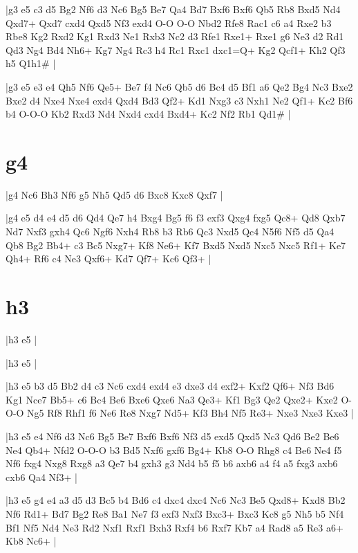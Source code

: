 \whitename{}
\blackname{}
\makegametitle
|g3 e5 c3 d5 Bg2 Nf6 d3 Nc6 Bg5 Be7 Qa4 Bd7 Bxf6 Bxf6 Qb5 Rb8 Bxd5 Nd4 Qxd7+ Qxd7 cxd4 Qxd5 Nf3 exd4 O-O O-O Nbd2 Rfe8 Rac1 c6 a4 Rxe2 b3 Rbe8 Kg2 Rxd2 Kg1 Rxd3 Ne1 Rxb3 Nc2 d3 Rfe1 Rxe1+ Rxe1 g6 Ne3 d2 Rd1 Qd3 Ng4 Bd4 Nh6+ Kg7 Ng4 Rc3 h4 Rc1 Rxc1 dxc1=Q+ Kg2 Qcf1+ Kh2 Qf3 h5 Q1h1\#  |

\whitename{}
\blackname{}
\makegametitle
|g3 e5 e3 e4 Qh5 Nf6 Qe5+ Be7 f4 Nc6 Qb5 d6 Bc4 d5 Bf1 a6 Qe2 Bg4 Nc3 Bxe2 Bxe2 d4 Nxe4 Nxe4 exd4 Qxd4 Bd3 Qf2+ Kd1 Nxg3 c3 Nxh1 Ne2 Qf1+ Kc2 Bf6 b4 O-O-O Kb2 Rxd3 Nd4 Nxd4 cxd4 Bxd4+ Kc2 Nf2 Rb1 Qd1\#  |

\section{g4}

\whitename{}
\blackname{}
\makegametitle
|g4 Nc6 Bh3 Nf6 g5 Nh5 Qd5 d6 Bxc8 Kxc8 Qxf7  |

\whitename{}
\blackname{}
\makegametitle
|g4 e5 d4 e4 d5 d6 Qd4 Qe7 h4 Bxg4 Bg5 f6 f3 exf3 Qxg4 fxg5 Qc8+ Qd8 Qxb7 Nd7 Nxf3 gxh4 Qc6 Ngf6 Nxh4 Rb8 b3 Rb6 Qc3 Nxd5 Qc4 N5f6 Nf5 d5 Qa4 Qb8 Bg2 Bb4+ c3 Bc5 Nxg7+ Kf8 Ne6+ Kf7 Bxd5 Nxd5 Nxc5 Nxc5 Rf1+ Ke7 Qh4+ Rf6 c4 Ne3 Qxf6+ Kd7 Qf7+ Kc6 Qf3+  |
 
\section{h3} 
 
\whitename{}
\blackname{}
\makegametitle
|h3 e5  |

\whitename{}
\blackname{}
\makegametitle
|h3 e5  |

\whitename{}
\blackname{}
\makegametitle
|h3 e5 b3 d5 Bb2 d4 c3 Nc6 cxd4 exd4 e3 dxe3 d4 exf2+ Kxf2 Qf6+ Nf3 Bd6 Kg1 Nce7 Bb5+ c6 Bc4 Be6 Bxe6 Qxe6 Na3 Qe3+ Kf1 Bg3 Qe2 Qxe2+ Kxe2 O-O-O Ng5 Rf8 Rhf1 f6 Ne6 Re8 Nxg7 Nd5+ Kf3 Bh4 Nf5 Re3+ Nxe3 Nxe3 Kxe3  |

\whitename{}
\blackname{}
\makegametitle
|h3 e5 e4 Nf6 d3 Nc6 Bg5 Be7 Bxf6 Bxf6 Nf3 d5 exd5 Qxd5 Nc3 Qd6 Be2 Be6 Ne4 Qb4+ Nfd2 O-O-O b3 Bd5 Nxf6 gxf6 Bg4+ Kb8 O-O Rhg8 c4 Be6 Ne4 f5 Nf6 fxg4 Nxg8 Rxg8 a3 Qe7 b4 gxh3 g3 Nd4 b5 f5 b6 axb6 a4 f4 a5 fxg3 axb6 cxb6 Qa4 Nf3+  |

\whitename{}
\blackname{}
\makegametitle
|h3 e5 g4 e4 a3 d5 d3 Bc5 b4 Bd6 c4 dxc4 dxc4 Nc6 Nc3 Be5 Qxd8+ Kxd8 Bb2 Nf6 Rd1+ Bd7 Bg2 Re8 Ba1 Ne7 f3 exf3 Nxf3 Bxc3+ Bxc3 Kc8 g5 Nh5 b5 Nf4 Bf1 Nf5 Nd4 Ne3 Rd2 Nxf1 Rxf1 Bxh3 Rxf4 b6 Rxf7 Kb7 a4 Rad8 a5 Re3 a6+ Kb8 Nc6+  |

